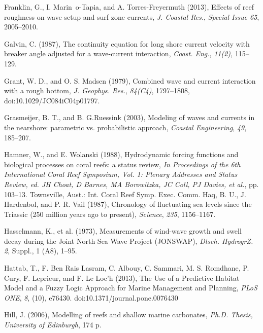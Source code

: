 \documentclass[default,jgrga]{agutex2015}
\begin{document}
\begin{article}
\begin{thebibliography}{}
Franklin, G., I. Marin~o-Tapia, and A. Torres-Freyermuth (2013), Effects of reef roughness on wave setup and surf zone currents, \textit{J. Coastal Res.}, \textit{Special Issue 65}, 2005--2010.

Galvin, C. (1987), The continuity equation for long shore current velocity with breaker angle adjusted for a wave-current interaction, \textit{Coast. Eng.}, \textit{11(2)}, 115--129.

Grant, W. D., and O. S. Madsen (1979), Combined wave and current interaction with a rough bottom, \textit{J. Geophys. Res.}, \textit{84(C4)}, 1797--1808, doi:10.1029/JC084iC04p01797.

Grasmeijer, B. T., and B. G.Ruessink (2003), Modeling of waves and currents in the nearshore: parametric vs. probabilistic approach, \textit{Coastal Engineering}, \textit{49}, 185--207.

Hamner, W., and E. Wolanski (1988), Hydrodynamic forcing functions and biological processes on coral reefs: a status review, \textit{In Proceedings of the 6th International Coral Reef Symposium, Vol. 1: Plenary Addresses and Status Review, ed. JH Choat, D Barnes, MA Borowitzka, JC Coll, PJ Davies, et al.}, pp. 103--13. Townsville, Aust.: Int. Coral Reef Symp. Exec. Comm.
Haq, B. U., J. Hardenbol, and P. R. Vail (1987), Chronology of fluctuating sea levels since the Triassic (250 million years ago to present), \textit{Science}, \textit{235}, 1156--1167.

Hasselmann, K., et al. (1973), Measurements of wind-wave growth and swell decay during the Joint North Sea Wave Project (JONSWAP), \textit{Dtsch. HydrogrZ. 2}, Suppl., 1 (A8), 1--95.

Hattab, T., F. Ben Rais Lasram, C. Albouy, C. Sammari, M. S. Romdhane, P. Cury, F. Leprieur, and F. Le Loc'h (2013), The Use of a Predictive Habitat Model and a Fuzzy Logic Approach for Marine Management and Planning, \textit{PLoS ONE}, \textit{8}, (10), e76430. doi:10.1371/journal.pone.0076430

Hill, J. (2006), Modelling of reefs and shallow marine carbonates, \textit{Ph.D. Thesis, University of Edinburgh}, 174 p.


\end{thebibliography}
\end{article}
\end{document}
